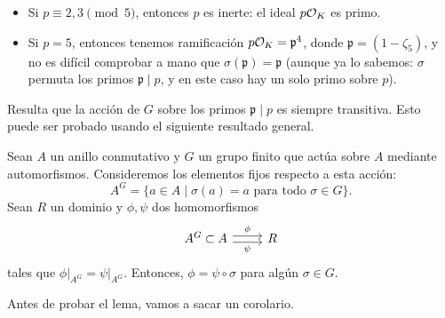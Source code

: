 \begin{ejemplo}
\begin{itemize}
\iffalse
    Esto se debe al hecho de que
    en $\FF_p [x]$
    $$\Phi_5 (x) = (x^2 - (a + a^4)\,x + 1)\,(x^2 - (a^2 + a^3)\,x + 1),$$
    donde $a$ es una raíz quinta primitiva en $\FF_{p^2}$. En este caso podemos
    ver que
    \[ (\zeta_5^2 + (a^2 + a^3)\,\zeta_5 + 1) \,
       (\zeta_5^2 - (a^2 + a^3)\,\zeta_5 + 1) \equiv
       \zeta_5^4 - (a + a^4)\,\zeta_5^2 + 1 \pmod{p}, \]
    y esto de manera similar al caso anterior implica que
    $\sigma (\mathfrak{p}_1) = \mathfrak{p}_2$. Esto implica que
    $\sigma (\mathfrak{p}_2) = \mathfrak{p}_1$.
\fi

  \item Si $p \equiv 2,3 \pmod{5}$, entonces $p$ es inerte: el ideal $p\mathcal{O}_K$
    es primo.

  \item Si $p = 5$, entonces tenemos ramificación $p\mathcal{O}_K = \mathfrak{p}^4$,
    donde $\mathfrak{p} = (1 - \zeta_5)$, y no es difícil comprobar a mano que
    $\sigma (\mathfrak{p}) = \mathfrak{p}$ (aunque ya lo sabemos: $\sigma$
    permuta los primos $\mathfrak{p} \mid p$, y en este caso hay un solo
    primo sobre $p$). \qedhere
  \end{itemize}
\end{ejemplo}

Resulta que la acción de $G$ sobre los primos $\mathfrak{p} \mid p$ es siempre
transitiva. Esto puede ser probado usando el siguiente resultado general.

\begin{lema}[Tate]
  Sean $A$ un anillo conmutativo y $G$ un grupo finito que actúa sobre $A$
  mediante automorfismos. Consideremos los elementos fijos respecto a esta
  acción:
  $$A^G = \{ a \in A \mid \sigma (a) = a \text{ para todo }\sigma\in G \}.$$
  Sean $R$ un dominio y $\phi,\psi$ dos homomorfismos
  \[ \begin{tikzcd}
    A^G &[-3em] \subset &[-3em] A \ar[shift left=0.25em]{r}{\phi}\ar[shift right=0.25em]{r}[swap]{\psi} & R
  \end{tikzcd} \]
  tales que $\left.\phi\right|_{A^G} = \left.\psi\right|_{A^G}$. Entonces,
  $\phi = \psi\circ\sigma$ para algún $\sigma \in G$.
\end{lema}

Antes de probar el lema, vamos a sacar un corolario.

